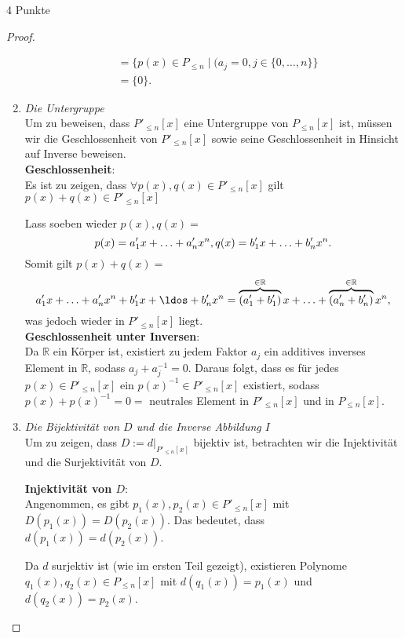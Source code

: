 \documentclass{../problemset}
\begin{document}
\begin{problem}{4 Punkte}
\begin{proof}
\begin{enumerate}
\begin{align}
			                                 & = \{p(x) \in P_{\le n} \mid (a_j = 0, j \in \{0, \ldots, n\}\}                                                                    \\
			                                 & = \{0\}.
		      \end{align}
		      \checkmark
		\item \textit{Die Untergruppe} \\
		      Um zu beweisen, dass $P'_{\le n}[x]$ eine Untergruppe von $P_{\le n}[x]$ ist, müssen wir die Geschlossenheit von $P'_{\le n}[x]$ sowie seine Geschlossenheit in Hinsicht auf Inverse beweisen. \\
		      \textbf{Geschlossenheit}: \\
		      Es ist zu zeigen, dass $\forall p(x),q(x) \in P'_{\le n}[x]$ gilt $p(x) + q(x) \in P'_{\le n}[x]$

		      Lass soeben wieder $p(x), q(x) =$ \[
			      p(x) = a^\prime_1x + \ldots + a^\prime_nx^n, \\
			      q(x) = b^\prime_1x + \ldots + b^\prime_nx^n.
		      \]
		      Somit gilt $p(x) + q(x) =$ \[
			      a^\prime_1x + \ldots + a^\prime_nx^n + b^\prime_1x + \ldos + b^\prime_nx^n =
			      \overbrace{(a^\prime_1+b^\prime_1)}^{\in \mathbb{R}}x + \ldots + \overbrace{(a^\prime_n+b^\prime_n)}^{\in \mathbb{R}}x^n,
		      \] was jedoch wieder in $P'_{\le n}[x]$ liegt.
		      \checkmark
		      \\
		      \textbf{Geschlossenheit unter Inversen}: \\
		      Da $\mathbb{R}$ ein Körper ist, existiert zu jedem Faktor $a_j$ ein additives inverses Element in $\mathbb{R}$, sodass $a_j + a_j^{-1} = 0$.
		      Daraus folgt, dass es für jedes $p(x) \in P'_{\le n}[x]$ ein $p(x)^{-1} \in P'_{\le n}[x]$ existiert, sodass $p(x) + p(x)^{-1} = 0 =$ neutrales Element in $P'_{\le n}[x]$ und in $P_{\le n}[x]$.
		      \checkmark
		\item \textit{Die Bijektivität von $D$ und die Inverse Abbildung $I$} \\
		      Um zu zeigen, dass $D := d|_{P'_{\le n}[x]}$ bijektiv ist, betrachten wir die Injektivität und die Surjektivität von $D$.

		      \textbf{Injektivität von $D$}: \\
		      Angenommen, es gibt $p_1(x), p_2(x) \in P'_{\le n}[x]$ mit $D(p_1(x)) = D(p_2(x))$. Das bedeutet, dass $d(p_1(x)) = d(p_2(x))$.

		      Da $d$ surjektiv ist (wie im ersten Teil gezeigt), existieren Polynome $q_1(x), q_2(x) \in P_{\le n}[x]$ mit $d(q_1(x)) = p_1(x)$ und $d(q_2(x)) = p_2(x)$.


\end{enumerate}
\end{proof}
\end{problem}
\end{document}
